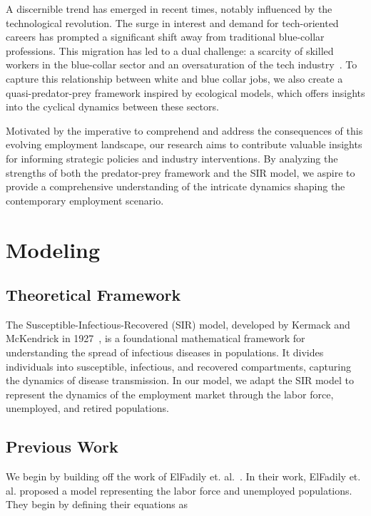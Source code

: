 \documentclass[11pt]{amsart}
\begin{document}
A discernible trend has emerged in recent times, 
notably influenced by the technological revolution. The surge in interest and demand for tech-oriented careers 
has prompted a significant shift away from traditional blue-collar professions. This migration has led to a 
dual challenge: a scarcity of skilled workers in the blue-collar sector and an oversaturation of the tech 
industry~\cite{SHRMBlueCollarDrought}. To capture this relationship between white and blue collar jobs, we also create a quasi-predator-prey 
framework inspired by ecological models, which offers insights into the cyclical dynamics between these sectors. 

Motivated by the imperative to comprehend and address the consequences of this evolving employment landscape, 
our research aims to contribute valuable insights for informing strategic policies and industry interventions. 
By analyzing the strengths of both the predator-prey framework and the SIR model, we aspire to provide a 
comprehensive understanding of the intricate dynamics shaping the contemporary employment scenario.

\section{Modeling}

\subsection{Theoretical Framework}

The Susceptible-Infectious-Recovered (SIR) model, developed by Kermack and McKendrick in 1927~\cite{kermack1927contribution}, 
is a foundational mathematical framework for understanding the spread of infectious diseases in populations. 
It divides individuals into susceptible, infectious, and recovered compartments, capturing the dynamics of disease transmission.
In our model, we adapt the SIR model to represent the dynamics of the employment market through the labor force,
unemployed, and retired populations.

\subsection{Previous Work}

We begin by building off the work of ElFadily et. al.~\cite{ElFadily}. In their work, ElFadily et. al. proposed a model
 representing the labor force and unemployed populations. They begin by defining their equations as
\end{document}
